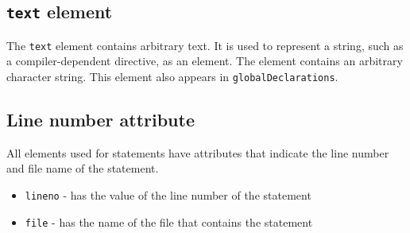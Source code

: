 \subsection{ {\tt text} element}

The {\tt text} element contains arbitrary text. It is used to represent a string, such as a compiler-dependent directive, as an element. The element contains an arbitrary character string. This element also appears in {\tt globalDeclarations}.


\subsection{Line number attribute}

All elements used for statements have attributes that indicate the line number and file name of the statement. 

\begin{itemize}
\item {\tt lineno} - has the value of the line number of the statement
\item {\tt file} - has the name of the file that contains the statement
\end{itemize}


